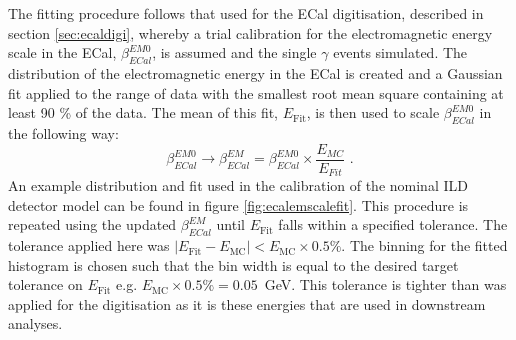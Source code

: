 The fitting procedure follows that used for the ECal digitisation, described in section \ref{sec:ecaldigi}, whereby a trial calibration for the electromagnetic energy scale in the ECal, $\beta^{EM0}_{ECal}$, is assumed and the single $\gamma$ events simulated.  The distribution of the electromagnetic energy in the ECal is created and a Gaussian fit applied to the range of data with the smallest root mean square containing at least 90 \% of the data.  The mean of this fit, $E_{\text{Fit}}$, is then used to scale $\beta^{EM0}_{ECal}$ in the following way:
%
\begin{equation}
\beta^{EM0}_{ECal} \rightarrow \beta^{EM}_{ECal} = \beta^{EM0}_{ECal} \times \frac{E_{MC}}{E_{Fit}}\text{ .}
\end{equation}
%
An example distribution and fit used in the calibration of the nominal ILD detector model can be found in figure \ref{fig:ecalemscalefit}.  This procedure is repeated using the updated $\beta^{EM}_{ECal}$ until $E_{\text{Fit}}$ falls within a specified tolerance.  The tolerance applied here was $|E_{\text{Fit}} - E_{\text{MC}}| < E_{\text{MC}} \times 0.5 \%$.  The binning for the fitted histogram is chosen such that the bin width is equal to the desired target tolerance on $E_{\text{Fit}}$ e.g. $E_{\text{MC}} \times 0.5 \% = 0.05$~GeV.  This tolerance is tighter than was applied for the digitisation as it is these energies that are used in downstream analyses.   
 
